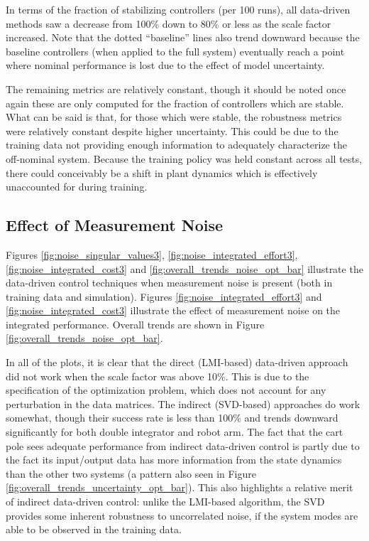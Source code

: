 In terms of the fraction of stabilizing controllers (per 100 runs), all data-driven methods saw a decrease from 100\% down to 80\% or less as the scale factor increased.  Note that the dotted ``baseline'' lines also trend downward because the baseline controllers (when applied to the full system) eventually reach a point where nominal performance is lost due to the effect of model uncertainty.

The remaining metrics are relatively constant, though it should be noted once again these are only computed for the fraction of controllers which are stable.  What can be said is that, for those which were stable, the robustness metrics were relatively constant despite higher uncertainty.  This could be due to the training data not providing enough information to adequately characterize the off-nominal system.  Because the training policy was held constant across all tests, there could conceivably be a shift in plant dynamics which is effectively unaccounted for during training.

\subsection{Effect of Measurement Noise}
Figures \ref{fig:noise_singular_values3}, \ref{fig:noise_integrated_effort3}, \ref{fig:noise_integrated_cost3} and \ref{fig:overall_trends_noise_opt_bar} illustrate the data-driven control techniques when measurement noise is present (both in training data and simulation).  Figures \ref{fig:noise_integrated_effort3} and \ref{fig:noise_integrated_cost3} illustrate the effect of measurement noise on the integrated performance.  Overall trends are shown in Figure \ref{fig:overall_trends_noise_opt_bar}.

In all of the plots, it is clear that the direct (LMI-based) data-driven approach did not work when the scale factor was above 10\%.  This is due to the specification of the optimization problem, which does not account for any perturbation in the data matrices.  The indirect (SVD-based) approaches do work somewhat, though their success rate is less than 100\% and trends downward significantly for both double integrator and robot arm.  The fact that the cart pole sees adequate performance from indirect data-driven control is partly due to the fact its input/output data has more information from the state dynamics than the other two systems (a pattern also seen in Figure \ref{fig:overall_trends_uncertainty_opt_bar}).  This also highlights a relative merit of indirect data-driven control: unlike the LMI-based algorithm, the SVD provides some inherent robustness to uncorrelated noise, if the system modes are able to be observed in the training data.

